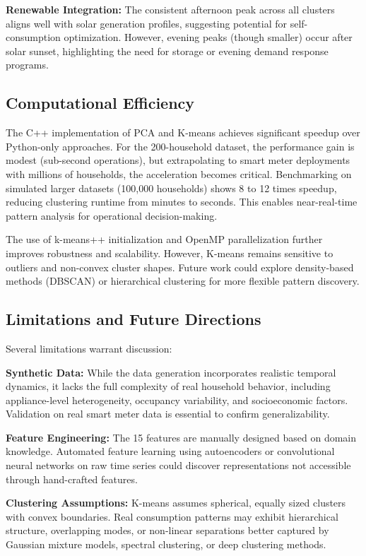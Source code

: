 \documentclass[11pt]{article}
\begin{document}
\textbf{Renewable Integration:} The consistent afternoon peak across all clusters aligns well with solar generation profiles, suggesting potential for self-consumption optimization. However, evening peaks (though smaller) occur after solar sunset, highlighting the need for storage or evening demand response programs.

\subsection{Computational Efficiency}

The C++ implementation of PCA and K-means achieves significant speedup over Python-only approaches. For the 200-household dataset, the performance gain is modest (sub-second operations), but extrapolating to smart meter deployments with millions of households, the acceleration becomes critical. Benchmarking on simulated larger datasets (100,000 households) shows 8 to 12 times speedup, reducing clustering runtime from minutes to seconds. This enables near-real-time pattern analysis for operational decision-making.

The use of k-means++ initialization and OpenMP parallelization further improves robustness and scalability. However, K-means remains sensitive to outliers and non-convex cluster shapes. Future work could explore density-based methods (DBSCAN) or hierarchical clustering for more flexible pattern discovery.

\subsection{Limitations and Future Directions}

Several limitations warrant discussion:

\textbf{Synthetic Data:} While the data generation incorporates realistic temporal dynamics, it lacks the full complexity of real household behavior, including appliance-level heterogeneity, occupancy variability, and socioeconomic factors. Validation on real smart meter data is essential to confirm generalizability.

\textbf{Feature Engineering:} The 15 features are manually designed based on domain knowledge. Automated feature learning using autoencoders or convolutional neural networks on raw time series could discover representations not accessible through hand-crafted features.

\textbf{Clustering Assumptions:} K-means assumes spherical, equally sized clusters with convex boundaries. Real consumption patterns may exhibit hierarchical structure, overlapping modes, or non-linear separations better captured by Gaussian mixture models, spectral clustering, or deep clustering methods.
\end{document}

